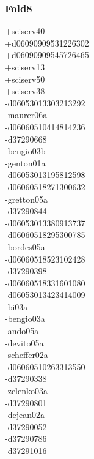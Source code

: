 \begin{multicols}{4}
\subsubsection*{Fold8}
+sciserv40\\
+d06090909531226302\\
+d06090909545726465\\
+sciserv13\\
+sciserv50\\
+sciserv38\\
-d06053013303213292\\
-maurer06a\\
-d06060510414814236\\
-d37290668\\
-bengio03b\\
-genton01a\\
-d06053013195812598\\
-d06060518271300632\\
-gretton05a\\
-d37290844\\
-d06053013380913737\\
-d06060518295300785\\
-bordes05a\\
-d06060518523102428\\
-d37290398\\
-d06060518331601080\\
-d06053013423414009\\
-bi03a\\
-bengio03a\\
-ando05a\\
-devito05a\\
-scheffer02a\\
-d06060510263313550\\
-d37290338\\
-zelenko03a\\
-d37290801\\
-dejean02a\\
-d37290052\\
-d37290786\\
-d37291016\\

\end{multicols}
